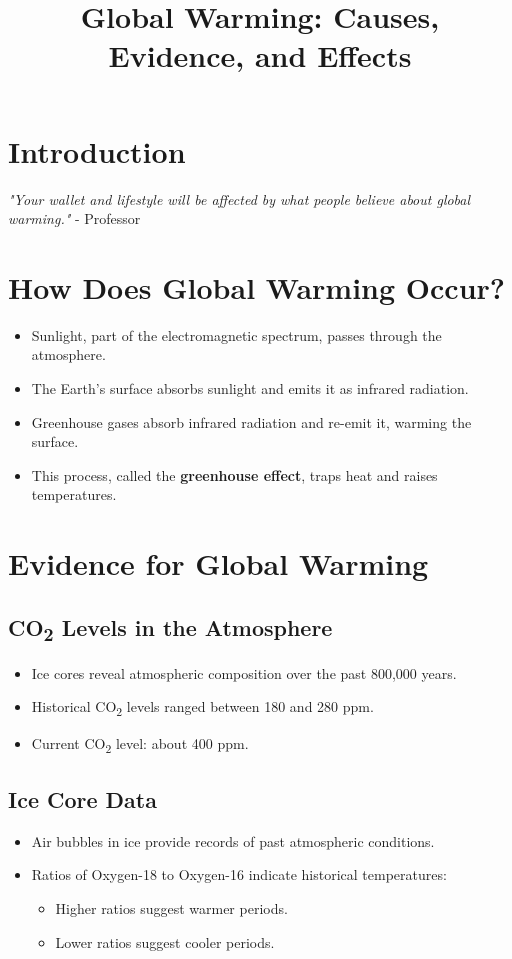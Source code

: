 \documentclass[12pt]{article}
\title{Global Warming: Causes, Evidence, and Effects}
\author{}
\date{}
\begin{document}
\maketitle

\section*{Introduction}
\textit{"Your wallet and lifestyle will be affected by what people believe about global warming."} - Professor

\section*{How Does Global Warming Occur?}
\begin{itemize}
    \item Sunlight, part of the electromagnetic spectrum, passes through the atmosphere.
    \item The Earth's surface absorbs sunlight and emits it as infrared radiation.
    \item Greenhouse gases absorb infrared radiation and re-emit it, warming the surface.
    \item This process, called the \textbf{greenhouse effect}, traps heat and raises temperatures.
\end{itemize}

\section*{Evidence for Global Warming}
\subsection*{CO\textsubscript{2} Levels in the Atmosphere}
\begin{itemize}
    \item Ice cores reveal atmospheric composition over the past 800,000 years.
    \item Historical CO\textsubscript{2} levels ranged between 180 and 280 ppm.
    \item Current CO\textsubscript{2} level: about 400 ppm.
\end{itemize}

\subsection*{Ice Core Data}
\begin{itemize}
    \item Air bubbles in ice provide records of past atmospheric conditions.
    \item Ratios of Oxygen-18 to Oxygen-16 indicate historical temperatures:
    \begin{itemize}
        \item Higher ratios suggest warmer periods.
        \item Lower ratios suggest cooler periods.
    \end{itemize}
\end{itemize}
\end{document}
